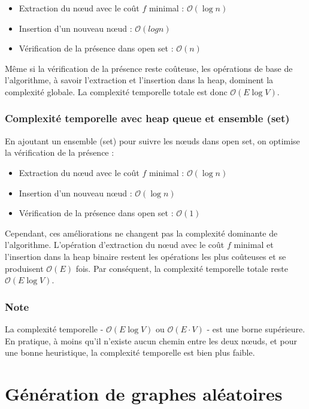 \begin{itemize}
    \item Extraction du nœud avec le coût \( f \) minimal : $\mathcal{O}(\log n)$
    \item Insertion d'un nouveau nœud : $\mathcal{O}(log n)$
    \item Vérification de la présence dans open set : $\mathcal{O}(n)$
\end{itemize}

Même si la vérification de la présence reste coûteuse, les opérations de base de l'algorithme, à savoir l'extraction et l'insertion dans la heap, dominent la complexité globale. La complexité temporelle totale est donc $\mathcal{O}(E \log V)$.

\subsubsection{Complexité temporelle avec heap queue et ensemble (set)}
En ajoutant un ensemble (set) pour suivre les nœuds dans open set, on optimise la vérification de la présence :

\begin{itemize}
    \item Extraction du nœud avec le coût \( f \) minimal : $\mathcal{O}(\log n)$
    \item Insertion d'un nouveau nœud : $\mathcal{O}(\log n)$
    \item Vérification de la présence dans open set : $\mathcal{O}(1)$
\end{itemize}

Cependant, ces améliorations ne changent pas la complexité dominante de l'algorithme. L'opération d'extraction du nœud avec le coût \( f \) minimal et l'insertion dans la heap binaire restent les opérations les plus coûteuses et se produisent $\mathcal{O}(E)$ fois. Par conséquent, la complexité temporelle totale reste $\mathcal{O}(E \log V)$.

\subsubsection*{Note}
La complexité temporelle - $\mathcal{O}(E \log V)$ ou $\mathcal{O}(E \cdot V)$ - est une borne supérieure. En pratique, à moins qu'il n'existe aucun chemin entre les deux nœuds, et pour une bonne heuristique, la complexité temporelle est bien plus faible.


\section{Génération de graphes aléatoires}
\label{sec:shortest_path_random_graph}

